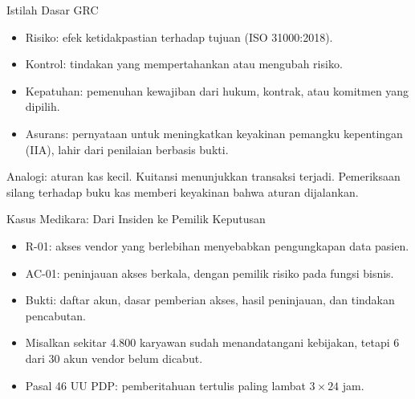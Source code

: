 \documentclass[aspectratio=169, table, 12pt]{beamer}
\begin{document}
\begin{frame}{{\Large Istilah Dasar GRC}}
  \vspace{4pt}
  \small
  \begin{itemize}
    \item Risiko: efek ketidakpastian terhadap tujuan (ISO 31000:2018).
    \item Kontrol: tindakan yang mempertahankan atau mengubah risiko.
    \item Kepatuhan: pemenuhan kewajiban dari hukum, kontrak, atau komitmen yang dipilih.
    \item Asurans: pernyataan untuk meningkatkan keyakinan pemangku kepentingan (IIA), lahir dari
          penilaian berbasis bukti.
  \end{itemize}
  \vspace{4pt}
  {\footnotesize Analogi: aturan kas kecil. Kuitansi menunjukkan transaksi terjadi. Pemeriksaan
  silang terhadap buku kas memberi keyakinan bahwa aturan dijalankan.}
\end{frame}

\begin{frame}{{\Large Kasus Medikara: Dari Insiden ke Pemilik Keputusan}}
  \vspace{4pt}
  \small
  \begin{itemize}
    \item R-01: akses vendor yang berlebihan menyebabkan pengungkapan data pasien.
    \item AC-01: peninjauan akses berkala, dengan pemilik risiko pada fungsi bisnis.
    \item Bukti: daftar akun, dasar pemberian akses, hasil peninjauan, dan tindakan pencabutan.
    \item Misalkan sekitar 4.800 karyawan sudah menandatangani kebijakan, tetapi 6 dari 30 akun
          vendor belum dicabut.
    \item Pasal 46 UU PDP: pemberitahuan tertulis paling lambat $3 \times 24$ jam.
  \end{itemize}
\end{frame}
\end{document}
